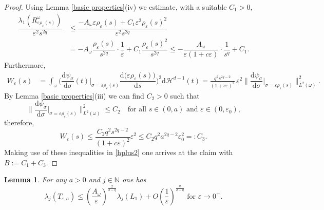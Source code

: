\documentclass[11pt,oneside,reqno,a4paper]{amsart}
\newcommand{\dd}{\mathrm{d}}
\newcommand{\N}{\mathbb{N}}
\renewcommand{\H}{\mathcal{H}}
\newcommand{\eps}{\varepsilon}
\newtheorem{lemma}[theorem]{Lemma}
\theoremstyle{definition}
\begin{document}
\begin{proof}
Using Lemma \ref{basic properties}(iv) we estimate, with a suitable $C_1>0$,
\begin{align*}
\dfrac{\lambda_1(R^\omega_{\eps\rho_\eps(s)})}{\eps^2 s^{2q}}&
\le \dfrac{-A_\omega \eps\rho_\eps(s) +C_1\eps^2\rho_\eps(s)^2}{\eps^2s^{2q}}\\
&=-A_\omega \dfrac{\rho_\eps(s)}{s^{2q}}\cdot\dfrac{1}{\eps}+C_1\dfrac{\rho_\eps(s)^2}{s^{2q}}\le -\dfrac{A_\omega}{\eps(1+c\eps)}\cdot\dfrac{1}{s^q}+C_1.
\end{align*}
Furthermore,
\begin{equation*}
	\begin{split}
		W_\eps(s)
		&=\int_{\omega}\bigg(\dfrac{\dd \psi_\sigma}{\dd\sigma}(t)\Big|_{\sigma=\eps\rho_\eps(s)}
		\dfrac{\dd\big(\eps \rho_\eps(s)\big)}{\dd s}\bigg)^2\dd\H^{d-1}(t)=\frac{q^2s^{2q-2}}{(1+c\eps)^2}\,\eps^2\bigg\|\dfrac{\dd \psi_\sigma}{\dd\sigma}\Big|_{\sigma=\eps\rho_\eps(s)}\bigg\|^2_{L^2(\omega)}.
	\end{split}
\end{equation*}
By Lemma \ref{basic properties}(iii) we can find $C_2>0$ such that
\[
\bigg\|\dfrac{\dd \psi_\sigma}{\dd\sigma}\Big|_{\sigma=\eps\rho_\eps(s)}\bigg\|^2_{L^2(\omega)}\le C_2 \quad\text{for all $s\in(0,a)$ and $\eps\in(0,\eps_0)$,}
\]
therefore,
\[
W_\eps(s)\le \dfrac{C_2q^2s^{2q-2}}{(1+c\eps)^2}\eps^2\le C_2 q^2 a^{2q-2}\eps_0^2=:C_3.
\]
Making use of these inequalities in \eqref{hplus2} one arrives at the claim with $B:=C_1+C_3$.
\end{proof}


\begin{lemma}\label{lem10}
For any $a>0$ and $j\in\N$ one has
\[
\lambda_j(T_{\eps,a})\le \left(\dfrac{A_\omega}{\eps}\right)^{\frac{2}{2-q}}\lambda_j(L_1)+O\left(\dfrac{1}{\eps}\right)^{\frac{q}{2-q}} \text{ for }\eps\to 0^+.
\]		
\end{lemma}
\end{document}
